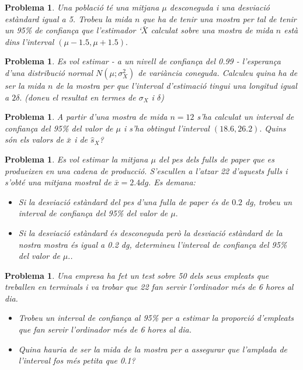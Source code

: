 \documentclass[11pt]{article}
\newcounter{prbcont}
\newtheorem{problema}[prbcont]{Problema}
\begin{document}
\begin{problema}
Una poblaci\'o t\'e una mitjana $\mu$ desconeguda i una desviaci\'o est\`andard igual a 5. Trobeu
la mida $n$ que ha de tenir una mostra per tal de tenir un 95\% de confian\c{c}a que
l'estimador `$\bar{X}$ calculat sobre una mostra de mida $n$ est\`a dins l'interval $(\mu-1.5,\mu+1.5).$ %
\end{problema}

\begin{problema}
Es vol estimar - a un nivell de confian\c{c}a del 0.99 - l'esperan\c{c}a d'una distribuci\'o normal
$N(\mu; \sigma_X^2)$ de vari\`ancia coneguda. Calculeu quina ha de ser la mida $n$ de la mostra per
que l'interval d'estimaci\'o tingui una longitud igual a $2\delta.$ (doneu el resultat en termes de $\sigma_X$ i $\delta$)%
\end{problema}

\begin{problema}
A partir d'una mostra de mida $n = 12$ s'ha calculat un interval de confian\c{c}a del 95\%
del valor de $\mu$ i s'ha obtingut l'interval $(18.6,26.2).$ Quins s\'on els valors de $\bar{x}$ i de $\hat{s}_X$? %
\end{problema}

\begin{problema}
Es vol estimar la mitjana $\mu$ del pes dels fulls de paper que es produeixen en una cadena
de producci\'o. S'escullen a l'atzar 22 d'aquests fulls i s'obt\'e una mitjana mostral de
$\bar{x} = 2.4 dg.$ Es demana:
\begin{itemize}
\item [(a)] Si la desviaci\'o est\`andard del pes d'una fulla de paper \'es de $0.2$ dg, trobeu un
interval de confian\c{c}a del 95\% del valor de $\mu.$ %
\item [(b)] Si la desviaci\'o est\`andard \'es desconeguda per\`o la desviaci\'o est\`andard 
de la nostra mostra \'es igual a 0.2 dg, determineu l'interval de confian\c{c}a del 95\%
del valor de $\mu.$. %
\end{itemize}
\end{problema}

\begin{problema}
Una empresa ha fet un test sobre 50 dels seus empleats que treballen en terminals i va
trobar que 22 fan servir l'ordinador m\'es de 6 hores al dia.
\begin{itemize}
\item [(a)] Trobeu un interval de confian\c{c}a al 95\% per a estimar la proporci\'o d'empleats que
fan servir l'ordinador m\'es de 6 hores al dia.
\item [(b)] Quina hauria de ser la mida de la mostra per a assegurar que l'amplada de l'interval fos m\'es petita que 0.1?
\end{itemize}
\end{problema}
\end{document}
